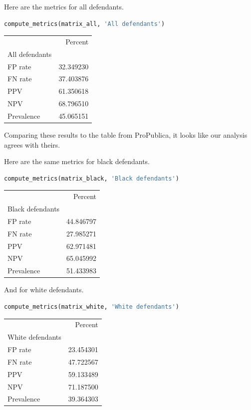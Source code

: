 Here are the metrics for all defendants.

\begin{lstlisting}[language=Python]
compute_metrics(matrix_all, 'All defendants')
\end{lstlisting}

\begin{tabular}{lr}
\toprule
{} &    Percent \\
All defendants &            \\
\midrule
FP rate        &  32.349230 \\
FN rate        &  37.403876 \\
PPV            &  61.350618 \\
NPV            &  68.796510 \\
Prevalence     &  45.065151 \\
\bottomrule
\end{tabular}

Comparing these results to the table from ProPublica, it looks like our
analysis agrees with theirs.

Here are the same metrics for black defendants.

\begin{lstlisting}[language=Python]
compute_metrics(matrix_black, 'Black defendants')
\end{lstlisting}

\begin{tabular}{lr}
\toprule
{} &    Percent \\
Black defendants &            \\
\midrule
FP rate          &  44.846797 \\
FN rate          &  27.985271 \\
PPV              &  62.971481 \\
NPV              &  65.045992 \\
Prevalence       &  51.433983 \\
\bottomrule
\end{tabular}

And for white defendants.

\begin{lstlisting}[language=Python]
compute_metrics(matrix_white, 'White defendants')
\end{lstlisting}

\begin{tabular}{lr}
\toprule
{} &    Percent \\
White defendants &            \\
\midrule
FP rate          &  23.454301 \\
FN rate          &  47.722567 \\
PPV              &  59.133489 \\
NPV              &  71.187500 \\
Prevalence       &  39.364303 \\
\bottomrule
\end{tabular}

